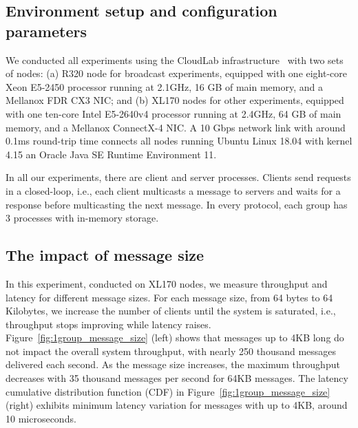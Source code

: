 \subsection{Environment setup and configuration parameters}
\label{sec:evaluation:setup}

We conducted all experiments using the CloudLab infrastructure~\cite{DuplyakinATC19cloudlab} with two sets of nodes: 
(a) R320 node for broadcast experiments, equipped with one eight-core Xeon E5-2450 processor running at 2.1GHz, 16 GB of main memory, and a Mellanox FDR CX3 NIC; and (b) XL170 nodes for other experiments, equipped with one ten-core Intel E5-2640v4 processor running at 2.4GHz, 64 GB of main memory, and a Mellanox ConnectX-4 NIC. 
A 10 Gbps network link with around 0.1ms round-trip time connects all nodes running Ubuntu Linux 18.04 with kernel 4.15 an Oracle Java SE Runtime Environment 11. 

In all our experiments, there are client and server processes. 
Clients send requests in a closed-loop, i.e., each client multicasts a message to servers and waits for a response before multicasting the next message. 
In every protocol, each group has 3 processes with in-memory storage.


\subsection{The impact of message size}
\label{sec:evaluation:micro}

In this experiment, conducted on XL170 nodes, we measure \libname throughput and latency for different message sizes.
For each message size, from 64 bytes to 64 Kilobytes, we increase the number of clients until the system is saturated, i.e., throughput stops improving while latency raises.
Figure~\ref{fig:1group_message_size} (left) shows that messages up to 4KB long do not impact the overall system throughput, with nearly 250 thousand messages delivered each second. 
As the message size increases, the maximum throughput decreases with 35 thousand messages per second for 64KB messages.
The latency cumulative distribution function (CDF) in Figure~\ref{fig:1group_message_size} (right) exhibits minimum latency variation for messages with up to 4KB, around 10 microseconds.

